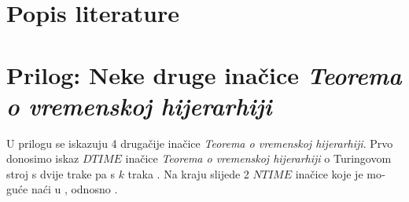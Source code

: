 \documentclass[12pt]{rectors}
\begin{document}
\begin{otherlanguage}{croatian}
%

%
%
%
%
%
\section{Popis literature}
\renewcommand{\refname}{}


\appendix
\section{Prilog: Neke druge inačice \textit{Teorema o vremenskoj hijerarhiji}}
U prilogu se iskazuju 4 drugačije inačice \textit{Teorema o vremenskoj hijerarhiji}.
Prvo donosimo iskaz $DTIME$ inačice \textit{Teorema o vremenskoj hijerarhiji} o Turingovom stroj s dvije trake\cite{teorem2traka,teorem2trake2} pa
s $k$ traka \cite{teoremktraka}. Na kraju slijede 2 $NTIME$ inačice koje je moguće naći u \cite{teoremntime}, odnosno \cite{teoremntime2}.


\end{otherlanguage}
\end{document}
